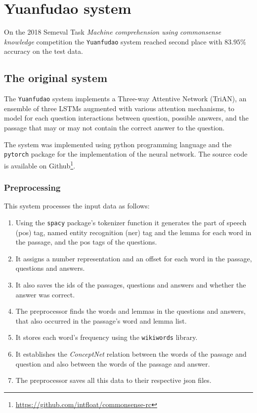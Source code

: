 \chapter{Yuanfudao system}
\label{chap:yuanfudao}
On the 2018 Semeval Task \textit{Machine comprehension using commonsense knowledge} competition the \texttt{Yuanfudao} \cite{Wang:2018} system reached second place with $83.95\%$ accuracy on the test data.

\section{The original system}

The \texttt{Yuanfudao} system implements a Three-way Attentive Network (TriAN), an ensemble of three LSTMs augmented with various attention mechanisms, to model for each question interactions between question, possible answers, and the passage that may or may not contain the correct answer to the question.

The system was implemented using python programming language and the \texttt{pytorch} package for the implementation of the neural network. The source code is available on Github\footnote{\url{https://github.com/intfloat/commonsense-rc}}.


\subsection{Preprocessing}
This system processes the input data as follows:

\begin{enumerate}
	\item Using the \texttt{spacy} package's tokenizer function it generates the part of speech (pos) tag, named entity recognition (ner) tag and the lemma for each word in the passage, and the pos tags of the questions.
	\item It assigns a number representation and an offset for each word in the passage, questions and answers.
	\item It also saves the ids of the passages, questions and answers and whether the answer was correct.
	\item The preprocessor finds the words and lemmas in the questions and answers, that also occurred in the passage's word and lemma list. 
	\item It stores each word's frequency using the \texttt{wikiwords} library.
	\item It  establishes the \textit{ConceptNet} relation between the words of the passage and question and also between the words of the passage and answer.
	\item The preprocessor saves all this data to their respective json files.
\end{enumerate}


